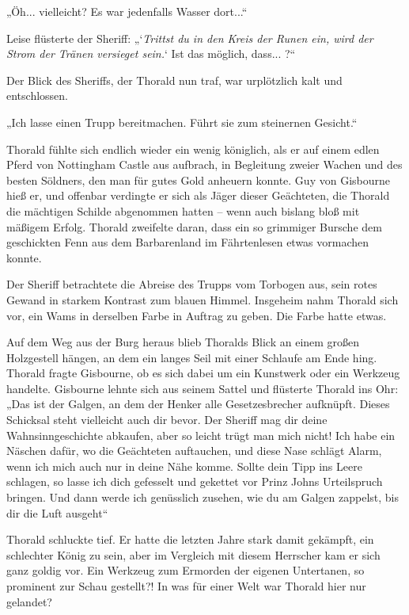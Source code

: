 „Öh... vielleicht? Es war jedenfalls Wasser dort...“

Leise flüsterte der Sheriff: „‘\textit{Trittst du in den Kreis der Runen ein, wird der Strom der Tränen versieget sein.}‘ Ist das möglich, dass... ?“

Der Blick des Sheriffs, der Thorald nun traf, war urplötzlich kalt und entschlossen.

„Ich lasse einen Trupp bereitmachen. Führt sie zum steinernen Gesicht.“



\trennzeichen



Thorald fühlte sich endlich wieder ein wenig königlich, als er auf einem edlen Pferd von Nottingham Castle aus aufbrach, in Begleitung zweier Wachen und des besten Söldners, den man für gutes Gold anheuern konnte. Guy von Gisbourne hieß er, und offenbar verdingte er sich als Jäger dieser Geächteten, die Thorald die mächtigen Schilde abgenommen hatten – wenn auch bislang bloß mit mäßigem Erfolg. Thorald zweifelte daran, dass ein so grimmiger Bursche dem geschickten Fenn aus dem Barbarenland im Fährtenlesen etwas vormachen konnte.

Der Sheriff betrachtete die Abreise des Trupps vom Torbogen aus, sein rotes Gewand in starkem Kontrast zum blauen Himmel. Insgeheim nahm Thorald sich vor, ein Wams in derselben Farbe in Auftrag zu geben. Die Farbe hatte etwas.

Auf dem Weg aus der Burg heraus blieb Thoralds Blick an einem großen Holzgestell hängen, an dem ein langes Seil mit einer Schlaufe am Ende hing. Thorald fragte Gisbourne, ob es sich dabei um ein Kunstwerk oder ein Werkzeug handelte. Gisbourne lehnte sich aus seinem Sattel und flüsterte Thorald ins Ohr: „Das ist der Galgen, an dem der Henker alle Gesetzesbrecher aufknüpft. Dieses Schicksal steht vielleicht auch dir bevor. Der Sheriff mag dir deine Wahnsinngeschichte abkaufen, aber so leicht trügt man mich nicht! Ich habe ein Näschen dafür, wo die Geächteten auftauchen, und diese Nase schlägt Alarm, wenn ich mich auch nur in deine Nähe komme. Sollte dein Tipp ins Leere schlagen, so lasse ich dich gefesselt und gekettet vor Prinz Johns Urteilspruch bringen. Und dann werde ich genüsslich zusehen, wie du am Galgen zappelst, bis dir die Luft ausgeht“

Thorald schluckte tief. Er hatte die letzten Jahre stark damit gekämpft, ein schlechter König zu sein, aber im Vergleich mit diesem Herrscher kam er sich ganz goldig vor. Ein Werkzeug zum Ermorden der eigenen Untertanen, so prominent zur Schau gestellt?! In was für einer Welt war Thorald hier nur gelandet?

